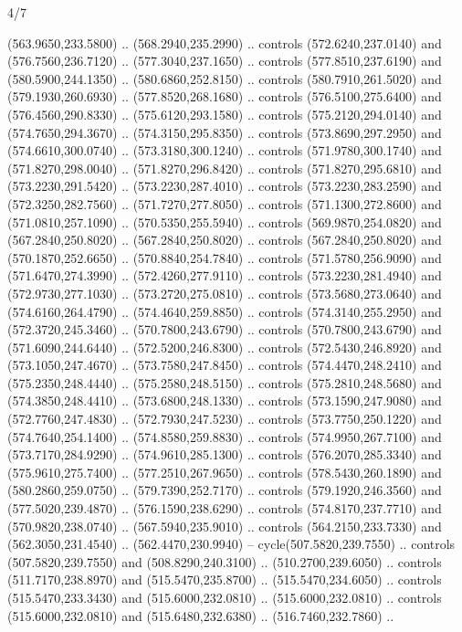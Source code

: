 \begin{flagdescription}{4/7}
\begin{scope}[shift={(0.5\flaglength,0.5\flagwidth)},scale=\flagwidth*\stretchfactor/820]
\begin{scope}[scale=1.87,xshift=-138mm,yshift=75mm]
\begin{scope}[y=0.8pt, x=0.8pt, yscale=-1, xscale=1]
\begin{scope}[fill=cd2a567]
  (563.9650,233.5800) .. (568.2940,235.2990) .. controls (572.6240,237.0140) and
  (576.7560,236.7120) .. (577.3040,237.1650) .. controls (577.8510,237.6190) and
  (580.5900,244.1350) .. (580.6860,252.8150) .. controls (580.7910,261.5020) and
  (579.1930,260.6930) .. (577.8520,268.1680) .. controls (576.5100,275.6400) and
  (576.4560,290.8330) .. (575.6120,293.1580) .. controls (575.2120,294.0140) and
  (574.7650,294.3670) .. (574.3150,295.8350) .. controls (573.8690,297.2950) and
  (574.6610,300.0740) .. (573.3180,300.1240) .. controls (571.9780,300.1740) and
  (571.8270,298.0040) .. (571.8270,296.8420) .. controls (571.8270,295.6810) and
  (573.2230,291.5420) .. (573.2230,287.4010) .. controls (573.2230,283.2590) and
  (572.3250,282.7560) .. (571.7270,277.8050) .. controls (571.1300,272.8600) and
  (571.0810,257.1090) .. (570.5350,255.5940) .. controls (569.9870,254.0820) and
  (567.2840,250.8020) .. (567.2840,250.8020) .. controls (567.2840,250.8020) and
  (570.1870,252.6650) .. (570.8840,254.7840) .. controls (571.5780,256.9090) and
  (571.6470,274.3990) .. (572.4260,277.9110) .. controls (573.2230,281.4940) and
  (572.9730,277.1030) .. (573.2720,275.0810) .. controls (573.5680,273.0640) and
  (574.6160,264.4790) .. (574.4640,259.8850) .. controls (574.3140,255.2950) and
  (572.3720,245.3460) .. (570.7800,243.6790) .. controls (570.7800,243.6790) and
  (571.6090,244.6440) .. (572.5200,246.8300) .. controls (572.5430,246.8920) and
  (573.1050,247.4670) .. (573.7580,247.8450) .. controls (574.4470,248.2410) and
  (575.2350,248.4440) .. (575.2580,248.5150) .. controls (575.2810,248.5680) and
  (574.3850,248.4410) .. (573.6800,248.1330) .. controls (573.1590,247.9080) and
  (572.7760,247.4830) .. (572.7930,247.5230) .. controls (573.7750,250.1220) and
  (574.7640,254.1400) .. (574.8580,259.8830) .. controls (574.9950,267.7100) and
  (573.7170,284.9290) .. (574.9610,285.1300) .. controls (576.2070,285.3340) and
  (575.9610,275.7400) .. (577.2510,267.9650) .. controls (578.5430,260.1890) and
  (580.2860,259.0750) .. (579.7390,252.7170) .. controls (579.1920,246.3560) and
  (577.5020,239.4870) .. (576.1590,238.6290) .. controls (574.8170,237.7710) and
  (570.9820,238.0740) .. (567.5940,235.9010) .. controls (564.2150,233.7330) and
  (562.3050,231.4540) .. (562.4470,230.9940) -- cycle(507.5820,239.7550) ..
  controls (507.5820,239.7550) and (508.8290,240.3100) .. (510.2700,239.6050) ..
  controls (511.7170,238.8970) and (515.5470,235.8700) .. (515.5470,234.6050) ..
  controls (515.5470,233.3430) and (515.6000,232.0810) .. (515.6000,232.0810) ..
  controls (515.6000,232.0810) and (515.6480,232.6380) .. (516.7460,232.7860) ..

\end{scope}
\end{scope}
\end{scope}
\end{scope}
\end{flagdescription}
